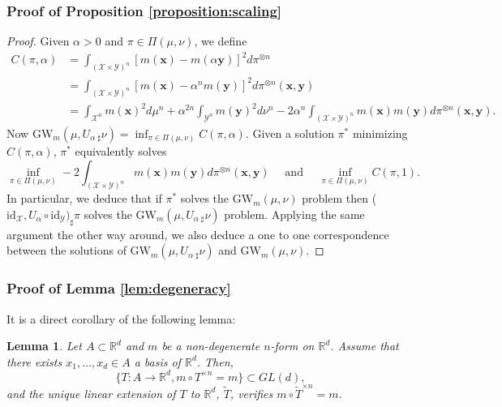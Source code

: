\documentclass{article}
\newcommand{\R}{\mathbb{R}}
\newcommand{\Y}{\mathcal{Y}}
\newcommand{\X}{\mathcal{X}}
\newcommand{\1}{\mathbf{1}}
\newcommand{\GW}{\mathrm{GW}}
\newtheorem{lemma}{Lemma}
\theoremstyle{definition}
\theoremstyle{remark}
\begin{document}
\begin{appendices}
\subsubsection*{Proof of Proposition \ref{proposition:scaling}}
\begin{proof}
    Given $\alpha>0$ and $\pi\in\Pi(\mu,\nu)$, we define 
    \begin{equation*}
        \begin{split}
            C(\pi,\alpha)&=\int_{(\X\times\Y)^n}[m(\mathbf{x})-m(\alpha\mathbf{y})]^2d\pi^{\otimes n}\\
            &= \int_{(\X\times\Y)^n}[m(\mathbf{x})-\alpha^nm(\mathbf{y})]^2d\pi^{\otimes n}(\mathbf{x},\mathbf{y})\\
            &= \int_{\X^n}m(\mathbf{x})^2d\mu^n+\alpha^{2n}\int_{\Y^n}m(\mathbf{y})^2d\nu^n-2\alpha^{n}\int_{(\X\times\Y)^n}m(\mathbf{x})m(\mathbf{y})d\pi^{\otimes n}(\mathbf{x},\mathbf{y}).
        \end{split}
    \end{equation*}
    Now  $\GW_m(\mu,U_{\alpha\;\sharp}\nu)= \inf_{\pi\in\Pi(\mu,\nu)} C(\pi,\alpha)$.
    Given a solution $\pi^*$ minimizing $C(\pi,\alpha)$, $\pi^*$ equivalently solves
    \[  \inf_{\pi\in\Pi(\mu,\nu)}-2\int_{(\X\times\Y)^n}m(\mathbf{x})m(\mathbf{y})d\pi^{\otimes n}(\mathbf{x},\mathbf{y})\quad\text{ and }\quad \inf_{\pi\in\Pi(\mu,\nu)}C(\pi,1).\]
    In particular, we deduce  that if $\pi^*$ solves the  $\GW_m(\mu,\nu)$ problem then ($\mathrm{id}_\X,U_{\alpha}\circ\mathrm{id}_\Y)_{\sharp}\pi$ solves the  $\GW_m(\mu,U_{\alpha\;\sharp}\nu)$ problem. Applying the same argument the other way around, we also deduce a one to one correspondence between the solutions of $\GW_m(\mu,U_{\alpha\;\sharp}\nu)$ and $\GW_m(\mu,\nu)$.
\end{proof}

\subsubsection*{Proof of Lemma \ref{lem:degeneracy}}

It is a direct corollary of the following lemma:

\begin{lemma}\label{lem:non_dege_small_set}
    Let $A\subset\R^d$ and $m$ be a non-degenerate $n$-form on $\R^d$. Assume that there exists $x_1,\dots,x_d\in A$ a basis of $\R^d$. Then, 
    \[\{T: A\to\R^d, m\circ T^{\times n}=m\}\subset GL(d),\] 
    and the unique linear extension of $T$ to $\R^d$, $\tilde{T}$, verifies $m\circ \tilde{T}^{\times n}=m$.
    

\end{lemma}
\end{appendices}
\end{document}
